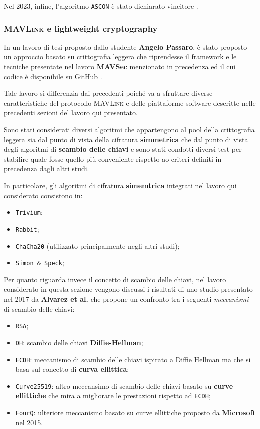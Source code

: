 \documentclass[a4paper, 12pt, oneside]{article}
\theoremstyle{definition}
\begin{document}
Nel 2023, infine, l'algoritmo \texttt{ASCON} è stato dichiarato vincitore \cite{nist-ascon-lwc}.
\newpage
\subsubsection{\textsc{MAVLink} e lightweight cryptography}
In un lavoro di tesi \cite{sec-uav} proposto dallo studente \textbf{Angelo Passaro}, è stato proposto un approccio basato su crittografia leggera che riprendesse il framework e le tecniche presentate nel lavoro \textbf{MAVSec} menzionato in precedenza ed il cui codice è disponibile su GitHub \cite{mavsec-github}.

Tale lavoro si differenzia dai precedenti poiché va a sfruttare diverse caratteristiche del protocollo \textsc{MAVLink} e delle piattaforme software descritte nelle precedenti sezioni del lavoro qui presentato.

Sono stati considerati diversi algoritmi che appartengono al pool della crittografia leggera sia dal punto di vista della cifratura \textbf{simmetrica} che dal punto di vista degli algoritmi di \textbf{scambio delle chiavi} e sono stati condotti diversi test per stabilire quale fosse quello più conveniente rispetto ao criteri definiti in precedenza dagli altri studi.

In particolare, gli algoritmi di cifratura \textbf{simemtrica} integrati nel lavoro qui considerato consistono in:

\begin{itemize}
    \item \texttt{Trivium};
    \item \texttt{Rabbit};
    \item \texttt{ChaCha20} (utilizzato principalmente negli altri studi);
    \item \texttt{Simon \& Speck};
\end{itemize}

Per quanto riguarda invece il concetto di scambio delle chiavi, nel lavoro considerato in questa sezione vengono discussi i risultati di uno studio \cite{10.1007/978-3-319-48799-1_58} presentato nel 2017 da \textbf{Alvarez et al.} che propone un confronto tra i seguenti \textit{meccanismi} di scambio delle chiavi:

\begin{itemize}
    \item \texttt{RSA};
    \item \texttt{DH}: scambio delle chiavi \textbf{Diffie-Hellman};
    \item \texttt{ECDH}: meccanismo di scambio delle chiavi ispirato a Diffie Hellman ma che si basa sul concetto di \textbf{curva ellittica};
    \item \texttt{Curve25519}: altro meccansimo di scambio delle chiavi basato su \textbf{curve ellittiche} che mira a migliorare le prestazioni rispetto ad \texttt{ECDH};
    \item \texttt{FourQ}: ulteriore meccanismo basato su curve ellittiche proposto da \textbf{Microsoft} nel 2015.
\end{itemize}
\end{document}
